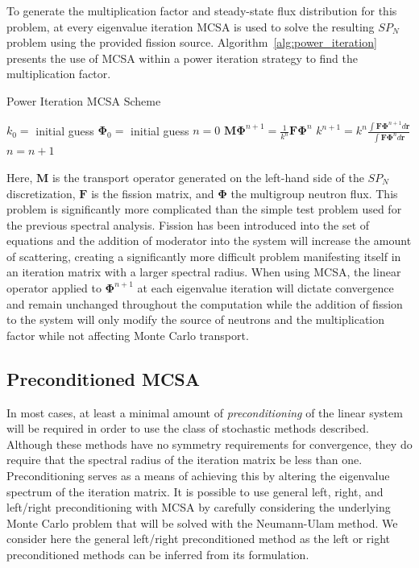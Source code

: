 \documentclass[letterpaper,12pt]{article}
\begin{document}
To generate the multiplication factor and steady-state flux
distribution for this problem, at every eigenvalue iteration MCSA is
used to solve the resulting $SP_N$ problem using the provided fission
source. Algorithm~\ref{alg:power_iteration} presents the use of MCSA
within a power iteration strategy to find the multiplication factor.
\begin{algorithm}[h!]
  \caption{Power Iteration MCSA Scheme}
  \label{alg:power_iteration}
  \begin{algorithmic}
    \State $k_0 =$ initial guess
    \State $\mathbf{\Phi}_0 =$ initial guess
    \State $n = 0$
    \State $\mathbf{M} \mathbf{\Phi}^{n+1} = \frac{1}{k^n} \mathbf{F} \mathbf{\Phi}^n$
    \State $k^{n+1} = k^n \frac{\int \mathbf{F} \mathbf{\Phi}^{n+1} d\mathbf{r}}{\int
      \mathbf{F} \mathbf{\Phi}^n d\mathbf{r}}$
    \State $n = n+1$
    \EndWhile
  \end{algorithmic}
\end{algorithm}
Here, $\mathbf{M}$ is the transport operator generated on the
left-hand side of the $SP_N$ discretization, $\mathbf{F}$ is the
fission matrix, and $\mathbf{\Phi}$ the multigroup neutron flux. This
problem is significantly more complicated than the simple test problem
used for the previous spectral analysis. Fission has been introduced
into the set of equations and the addition of moderator into the
system will increase the amount of scattering, creating a
significantly more difficult problem manifesting itself in an
iteration matrix with a larger spectral radius. When using MCSA, the
linear operator applied to $\mathbf{\Phi}^{n+1}$ at each eigenvalue
iteration will dictate convergence and remain unchanged throughout the
computation while the addition of fission to the system will only
modify the source of neutrons and the multiplication factor while not
affecting Monte Carlo transport.

\subsection{Preconditioned MCSA}
\label{subsec:preconditioning}
In most cases, at least a minimal amount of \textit{preconditioning}
of the linear system will be required in order to use the class of
stochastic methods described. Although these methods have no symmetry
requirements for convergence, they do require that the spectral radius
of the iteration matrix be less than one. Preconditioning serves as a
means of achieving this by altering the eigenvalue spectrum of the
iteration matrix. It is possible to use general left, right, and left/right
preconditioning with MCSA by carefully considering the underlying
Monte Carlo problem that will be solved with the Neumann-Ulam
method. We consider here the general left/right preconditioned method
as the left or right preconditioned methods can be inferred from its
formulation. 
\end{document}
